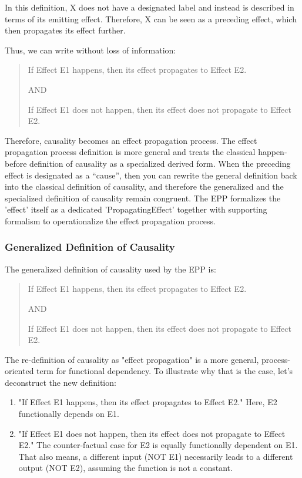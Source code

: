In this definition, X does not have a designated label and instead is described in terms of its emitting effect. Therefore, X can be seen as a preceding effect, which then propagates its effect further. 

Thus, we can write without loss of information:


\begin{quote}
	If Effect E1 happens, then its effect propagates to Effect E2.

    AND
    
	If Effect E1 does not happen, then its effect does not propagate to Effect E2.
\end{quote}

Therefore, causality becomes an effect propagation process. The effect propagation process definition is more general and treats the classical happen-before definition of causality as a specialized derived form. When the preceding effect is designated as a “cause”, then you can rewrite the general definition back into the classical definition of causality, and therefore the generalized and the specialized definition of causality remain congruent. The EPP formalizes the 'effect' itself as a dedicated 'PropagatingEffect' together with supporting formalism to operationalize the effect propagation process.


\subsubsection{Generalized Definition of Causality}
\label{sub:epp_general_def_causality}

The generalized definition of causality used by the EPP is:

\begin{quote}
	If Effect E1 happens, then its effect propagates to Effect E2.

    AND
    
	If Effect E1 does not happen, then its effect does not propagate to Effect E2.
\end{quote}


The re-definition of causality as "effect propagation" is a more general, process-oriented term for functional dependency.
To illustrate why that is the case, let's deconstruct the new definition:


\begin{enumerate}
    \item "If Effect E1 happens, then its effect propagates to Effect E2." Here, E2 functionally depends on E1.
    \item "If Effect E1 does not happen, then its effect does not propagate to Effect E2." The counter-factual case for E2 is equally functionally dependent on E1. That also means, a different input (NOT E1) necessarily leads to a different output (NOT E2), assuming the function is not a constant.
\end{enumerate}


